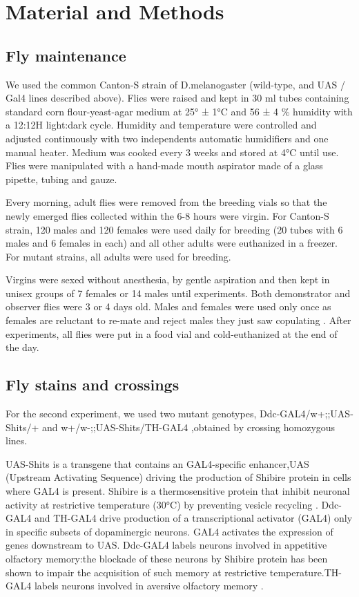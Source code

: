 \documentclass[a4paper, 12pt]{article}
\begin{document}
	
	\section{Material and Methods}

	\subsection{Fly maintenance}
	
	We used the common Canton-S strain of D.melanogaster (wild-type, and UAS / Gal4 lines described above). Flies were raised and kept in 30 ml tubes containing standard corn flour-yeast-agar medium at 25° ± 1°C and 56 ± 4 \% humidity with a 12:12H light:dark cycle. Humidity and temperature were controlled and adjusted continuously with two independents automatic humidifiers and one manual heater. Medium was cooked every 3 weeks and stored at 4°C until use. Flies were manipulated with a hand-made mouth aspirator made of a glass pipette, tubing and gauze.
	
	Every morning, adult flies were removed from the breeding vials so that the newly emerged flies collected within the 6-8 hours were virgin. For Canton-S strain, 120 males and 120 females were used daily for breeding (20 tubes with 6 males and 6 females in each) and all other adults were euthanized in a freezer. For mutant strains, all adults were used for breeding. 
	
	Virgins were sexed without anesthesia, by gentle aspiration and then kept in unisex groups of 7 females or 14 males until experiments. Both demonstrator and observer flies were 3 or 4 days old. Males and females were used only once as females are reluctant to re-mate \parencite{chapman_sex_2003} and reject males they just saw copulating \parencite{loyau_when_2012}. After experiments, all flies were put in a food vial and cold-euthanized at the end of the day.
	
	\subsection{Fly stains and crossings}
	
	For the second experiment, we used two mutant genotypes, Ddc-GAL4/w+;;UAS-Shits/+ and w+/w-;;UAS-Shits/TH-GAL4 ,obtained by crossing homozygous lines. 
	
	UAS-Shits is a transgene that contains an GAL4-specific enhancer,UAS (Upstream Activating Sequence) driving the production of Shibire protein in cells where GAL4 is present. Shibire is a thermosensitive protein that inhibit neuronal activity at restrictive temperature (30°C) by preventing vesicle recycling \parencite{kitamoto_conditional_2001}. Ddc-GAL4 and TH-GAL4 drive production of a transcriptional activator (GAL4) only in specific subsets of dopaminergic neurons. GAL4 activates the expression of genes downstream to UAS. Ddc-GAL4 labels neurons involved in appetitive olfactory memory:the blockade of these neurons by Shibire protein has been shown to impair the acquisition of such memory at restrictive temperature.TH-GAL4 labels neurons involved in aversive olfactory memory \parencite{liu_subset_2012}.
	
\end{document}
